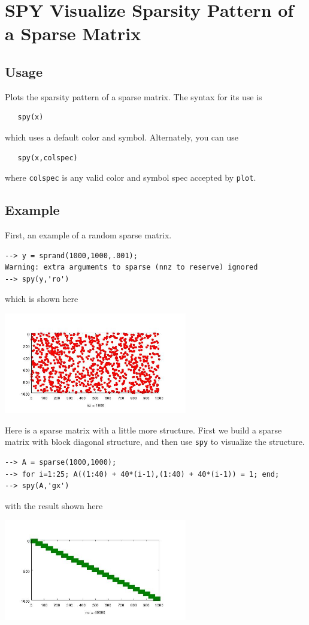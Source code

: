 \section{SPY Visualize Sparsity Pattern of a Sparse Matrix}

\subsection{Usage}

Plots the sparsity pattern of a sparse matrix.  The syntax for its use is
\begin{verbatim}
   spy(x)
\end{verbatim}
which uses a default color and symbol.  Alternately, you can use
\begin{verbatim}
   spy(x,colspec)
\end{verbatim}
where \verb|colspec| is any valid color and symbol spec accepted by \verb|plot|.
\subsection{Example}

First, an example of a random sparse matrix.
\begin{verbatim}
--> y = sprand(1000,1000,.001);
Warning: extra arguments to sparse (nnz to reserve) ignored
--> spy(y,'ro')
\end{verbatim}
which is shown here


\centerline{\includegraphics[width=8cm]{spy1}}

Here is a sparse matrix with a little more structure.  First we build a 
sparse matrix with block diagonal structure, and then use \verb|spy| to 
visualize the structure.
\begin{verbatim}
--> A = sparse(1000,1000);
--> for i=1:25; A((1:40) + 40*(i-1),(1:40) + 40*(i-1)) = 1; end;
--> spy(A,'gx')
\end{verbatim}
with the result shown here


\centerline{\includegraphics[width=8cm]{spy2}}

